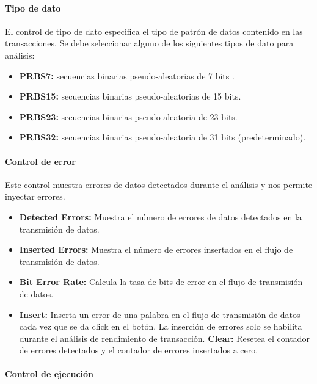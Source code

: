     \paragraph{Tipo de dato}

        El control de tipo de dato especifica el tipo de patr\'on de datos contenido en las transacciones. Se debe seleccionar alguno de los siguientes tipos de dato para an\'alisis:

        \begin{itemize}
            \item \textbf{PRBS7:} secuencias binarias pseudo-aleatorias de 7 bits .
            \item \textbf{PRBS15:} secuencias binarias pseudo-aleatorias de 15 bits.
            \item \textbf{PRBS23:} secuencias binarias pseudo-aleatoria de 23 bits.
            \item \textbf{PRBS32:} secuencias binarias pseudo-aleatoria de 31 bits (predeterminado).
        \end{itemize}

    \paragraph{Control de error}

        Este control muestra errores de datos detectados durante el an\'alisis y nos permite inyectar errores.

        \begin{itemize}
            \item \textbf{Detected Errors:} Muestra el n\'umero de errores de datos detectados en la transmisi\'on de datos.
            \item \textbf{Inserted Errors:} Muestra el n\'umero de errores insertados en el flujo de transmisi\'on de datos.
            \item \textbf{Bit Error Rate:} Calcula la tasa de bits de error en el flujo de transmisi\'on de datos.
            \item \textbf{Insert:} Inserta un error de una palabra en el flujo de transmisi\'on de datos cada vez que se da click en el bot\'on. La inserci\'on de errores solo se habilita durante el an\'alisis de rendimiento de transacci\'on.
            \textbf{Clear:} Resetea el contador de errores detectados y el contador de errores insertados a cero.
        \end{itemize}

    \paragraph{Control de ejecuci\'on}

